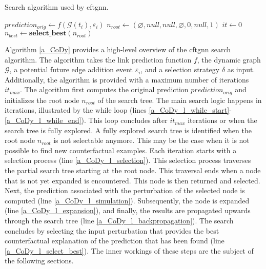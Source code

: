 {
\setlength{\algomargin}{1.25em}
\small
\begin{algorithm}[ht]
\caption{Search algorithm used by \gls{cftgnn}.}
\label{a_CoDy}
    $prediction_{orig} \gets f(\mathcal{G}(t_i), \varepsilon_i)$\;
    $n_{root} \gets (\varnothing, null, null, \varnothing, 0, null, 1)$\;
    $it \gets 0$\;
    \label{a_CoDy_l_while_end}
    $n_{best} \gets \mathrm{\textbf{select\_best}}(n_{root})$\; \label{a_CoDy_l_select_best}
\end{algorithm}
}

Algorithm \ref{a_CoDy} provides a high-level overview of the \gls{cftgnn} search algorithm. The algorithm takes the link prediction function $f$, the dynamic graph $\mathcal{G}$, a potential future edge addition event $\varepsilon_i$, and a selection strategy $\delta$ as input. Additionally, the algorithm is provided with a maximum number of iterations $it_{max}$. The algorithm first computes the original prediction $prediction_{orig}$ and initializes the root node $n_{root}$ of the search tree. The main search logic happens in iterations, illustrated by the while loop (lines \ref{a_CoDy_l_while_start}-\ref{a_CoDy_l_while_end}). This loop concludes after $it_{max}$ iterations or when the search tree is fully explored. A fully explored search tree is identified when the root node $n_{root}$ is not selectable anymore. This may be the case when it is not possible to find new counterfactual examples. Each iteration starts with a selection process (line \ref{a_CoDy_l_selection}). This selection process traverses the partial search tree starting at the root node. This traversal ends when a node that is not yet expanded is encountered. This node is then returned and selected. Next, the prediction associated with the perturbation of the selected node is computed (line \ref{a_CoDy_l_simulation}). Subsequently, the node is expanded (line \ref{a_CoDy_l_expansion}), and finally, the results are propagated upwards through the search tree (line \ref{a_CoDy_l_backpropagation}). The search concludes by selecting the input perturbation that provides the best counterfactual explanation of the prediction that has been found (line \ref{a_CoDy_l_select_best}). The inner workings of these steps are the subject of the following sections.

